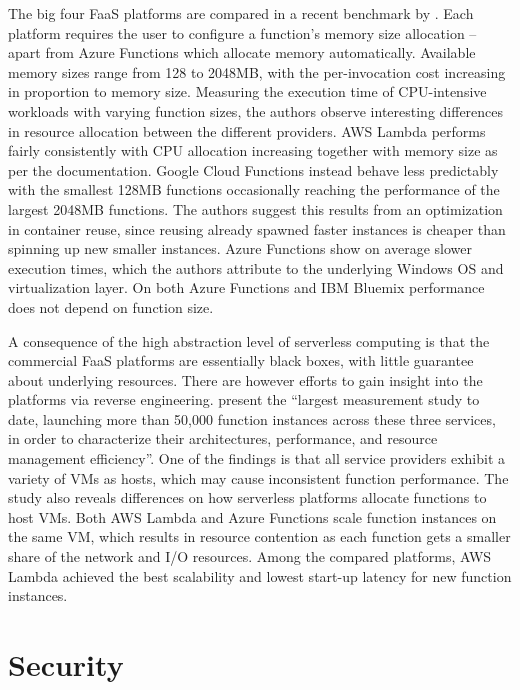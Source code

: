 The big four FaaS platforms are compared in a recent benchmark by \textcite{malawski18benchmark}. Each platform requires the user to configure a function's memory size allocation -- apart from Azure Functions which allocate memory automatically. Available memory sizes range from 128 to 2048MB, with the per-invocation cost increasing in proportion to memory size. Measuring the execution time of CPU-intensive workloads with varying function sizes, the authors observe interesting differences in resource allocation between the different providers. AWS Lambda performs fairly consistently with CPU allocation increasing together with memory size as per the documentation. Google Cloud Functions instead behave less predictably with the smallest 128MB functions occasionally reaching the performance of the largest 2048MB functions. The authors suggest this results from an optimization in container reuse, since reusing already spawned faster instances is cheaper than spinning up new smaller instances. Azure Functions show on average slower execution times, which the authors attribute to the underlying Windows OS and virtualization layer. On both Azure Functions and IBM Bluemix performance does not depend on function size.

A consequence of the high abstraction level of serverless computing is that the commercial FaaS platforms are essentially black boxes, with little guarantee about underlying resources. There are however efforts to gain insight into the platforms via reverse engineering. \textcite{wang18peekingbehindcurtains} present the ``largest measurement study to date, launching more than 50,000 function instances across these three services, in order to characterize their architectures, performance, and resource management efficiency''. One of the findings is that all service providers exhibit a variety of VMs as hosts, which may cause inconsistent function performance. The study also reveals differences on how serverless platforms allocate functions to host VMs. Both AWS Lambda and Azure Functions scale function instances on the same VM, which results in resource contention as each function gets a smaller share of the network and I/O resources. Among the compared platforms, AWS Lambda achieved the best scalability and lowest start-up latency for new function instances.

\section{Security} \label{sec:security}

